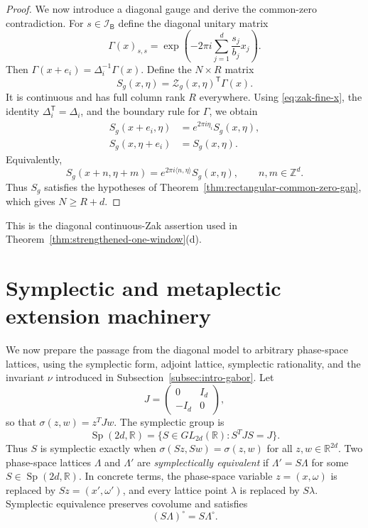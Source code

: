 \documentclass[11pt,reqno]{amsart}
\numberwithin{equation}{section}
\theoremstyle{definition}
\theoremstyle{remark}
\newcommand{\R}{\mathbb R}
\newcommand{\Z}{\mathbb Z}
\newcommand{\ip}[2]{\langle #1,#2\rangle}
\newcommand{\Sp}{\operatorname{Sp}}
\begin{document}
\begin{proof}
We now introduce a diagonal gauge and derive the common-zero contradiction.
For $s\in\mathcal I_{\mathsf B}$ define the diagonal unitary matrix
\begin{equation}\label{eq:zak-Gamma-definition}
 \Gamma(x)_{s,s}
  =\exp\left(-2\pi i\sum_{j=1}^d\frac{s_j}{b_j}x_j\right).
\end{equation}
Then $\Gamma(x+e_i)=\Delta_i^{-1}\Gamma(x)$.  Define the
$N\times R$ matrix
\begin{equation}\label{eq:zak-S-definition}
                    S_g(x,\eta)=\mathcal Z_g(x,\eta)^{\mathsf T}\Gamma(x).
\end{equation}
It is continuous and has full column rank $R$ everywhere.  Using
\eqref{eq:zak-fine-x}, the identity $\Delta_i^{\mathsf T}=\Delta_i$, and
the boundary rule for $\Gamma$, we obtain
\begin{align}
 S_g(x+e_i,\eta)
  &=e^{2\pi i\eta_i}S_g(x,\eta),
                                                        \label{eq:zak-S-u}\\
 S_g(x,\eta+e_i)
  &=S_g(x,\eta).                         \label{eq:zak-S-v}
\end{align}
Equivalently,
\begin{equation}\label{eq:zak-S-full-quasi}
 S_g(x+n,\eta+m)=e^{2\pi i\ip{n}{\eta}}S_g(x,\eta),
 \qquad n,m\in\Z^d.
\end{equation}
Thus $S_g$ satisfies the hypotheses of
Theorem~\ref{thm:rectangular-common-zero-gap}, which gives $N\ge R+d$.
\end{proof}

This is the diagonal continuous-Zak assertion used in
Theorem~\ref{thm:strengthened-one-window}(d).


\section{Symplectic and metaplectic extension machinery}
\label{sec:lattice-theory}

We now prepare the passage from the diagonal model to arbitrary phase-space
lattices, using the symplectic form, adjoint lattice, symplectic rationality,
and the invariant $\nu$ introduced in Subsection~\ref{subsec:intro-gabor}.  Let
\[
 J=\begin{pmatrix}0&I_d\\-I_d&0\end{pmatrix},
\]
so that $\sigma(z,w)=z^TJw$.  The symplectic group is
\[
 \Sp(2d,\R)
 =\{S\in GL_{2d}(\R):S^TJS=J\}.
\]
Thus $S$ is symplectic exactly when
$\sigma(Sz,Sw)=\sigma(z,w)$ for all $z,w\in\R^{2d}$.  Two phase-space
lattices $\Lambda$ and $\Lambda'$ are \emph{symplectically equivalent} if
$\Lambda'=S\Lambda$ for some $S\in\Sp(2d,\R)$.  In concrete terms, the
phase-space variable $z=(x,\omega)$ is replaced by
$Sz=(x',\omega')$, and every lattice point $\lambda$ is replaced by
$S\lambda$.  Symplectic equivalence preserves covolume and satisfies
\[
                         (S\Lambda)^\circ=S\Lambda^\circ.
\]
\end{document}
